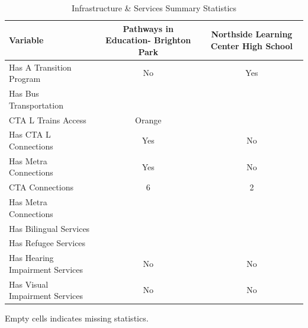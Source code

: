 \begin{table}[H]
\renewcommand{\arraystretch}{1.5}
\caption*{
{\large Infrastructure \& Services Summary Statistics}
} 

\fontsize{10pt}{11pt}\selectfont

\begin{tabular*}{\linewidth}{@{\extracolsep{\fill}}lcc}
\toprule
Variable & Pathways in Education- Brighton Park & Northside Learning Center High School \\ 
\midrule\addlinespace[2.5pt]
Has A Transition Program & No & Yes \\
Has Bus Transportation &  &  \\
CTA L Trains Access & Orange &  \\
Has CTA L Connections & Yes & No \\
Has Metra Connections & Yes & No \\
CTA Connections & 6 & 2 \\
Has Metra Connections &  &  \\
Has Bilingual Services &  &  \\
Has Refugee Services &  &  \\
Has Hearing Impairment Services & No & No \\
Has Visual Impairment Services & No & No \\
\bottomrule
\end{tabular*}
\begin{minipage}{\linewidth}
Empty cells indicates missing statistics.\\
\end{minipage}
\end{table}
